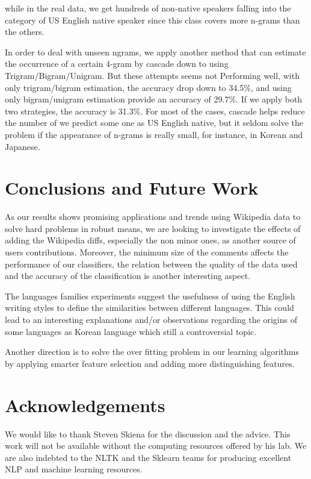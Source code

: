 \documentclass[11pt]{article}
\begin{document}
while in the real data, we get hundreds of non-native speakers falling into the category of US English native speaker since this class covers more n-grams than the others.

In order to deal with unseen ngrams, we apply another method that can estimate the occurrence of a certain 4-gram by cascade down to using Trigram/Bigram/Unigram. But these attempts seems not Performing well, with only trigram/bigram estimation, the accuracy drop down to 34.5\%, and using only bigram/unigram estimation provide an accuracy of 29.7\%. If we apply both two strategies, the accuracy is 31.3\%. For most of the cases, cascade helps reduce the number of we predict some one as US English native, but it seldom solve the problem if the appearance of n-grams is really small, for instance, in Korean and Japanese.  

\section{Conclusions and Future Work}
As our results shows promising applications and trends using Wikipedia data to solve hard problems in robust means, we are looking to investigate the effects of adding the Wikipedia diffs, especially the non minor ones, as another source of users contributions. Moreover, the minimum size of the comments affects the performance of our classifiers, the relation between the quality of the data used and the accuracy of the classification is another interesting aspect.

The languages families experiments suggest the usefulness of using the English writing styles to define the similarities between different languages. This could lead to an interesting explanations and/or observations regarding the origins of some languages as Korean language which still a controversial topic.

Another direction is to solve the over fitting problem in our learning algorithms by applying smarter feature selection and adding more distinguishing features.



\section*{Acknowledgements}
We would like to thank Steven Skiena for the discussion and the advice. This work will not be available without the computing resources offered by his lab. We are also indebted to the NLTK and the Sklearn teams for producing excellent NLP and machine learning resources.

{}

\end{document}
